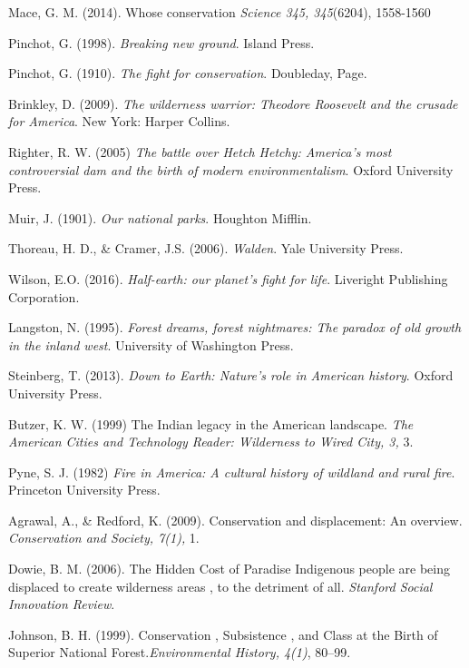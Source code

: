 \documentclass[rutwik_proposal.tex]{subfiles}
\begin{document}
\begin{thebibliography}{100}

Mace, G. M.
(2014).
Whose conservation
\emph{Science 345, 345}(6204),
1558-1560

Pinchot, G.
(1998).
\emph{Breaking new ground}.
Island Press.

Pinchot, G.
(1910).
\emph{The fight for conservation}.
Doubleday, Page.

Brinkley, D.
(2009).
\emph{The wilderness warrior: Theodore Roosevelt and the crusade for America}.
New York: Harper Collins.

Righter, R. W.
(2005)
\emph{The battle over Hetch Hetchy: America's most controversial dam and the birth of modern environmentalism}.
Oxford University Press.

Muir, J.
(1901).
\emph{Our national parks}.
Houghton Mifflin.

Thoreau, H. D., \& Cramer, J.S.
(2006).
\emph{Walden}.
Yale University Press.

Wilson, E.O.
(2016).
\emph{Half-earth: our planet's fight for life}.
Liveright Publishing Corporation.

Langston, N.
(1995).
\emph{Forest dreams, forest nightmares: The paradox of old growth in the inland west}.
University of Washington Press.

Steinberg, T.
(2013).
\emph{Down to Earth: Nature's role in American history}.
Oxford University Press.

Butzer, K. W.
(1999)
The Indian legacy in the American landscape.
\emph{The American Cities and Technology Reader: Wilderness to Wired City, 3,}
3.

Pyne, S. J.
(1982)
\emph{Fire in America: A cultural history of wildland and rural fire}.
Princeton University Press.

Agrawal, A., \& Redford, K.
(2009).
Conservation and displacement: An overview.
\emph{Conservation and Society, 7(1),} 1.

Dowie, B. M.
(2006).
The Hidden Cost of Paradise Indigenous people are being displaced to create wilderness areas , to the detriment of all.
\emph{Stanford Social Innovation Review}.

Johnson, B. H.
(1999).
Conservation , Subsistence , and Class at the Birth of Superior National Forest.\emph{Environmental History, 4(1)},
80–99.


\end{thebibliography}
\end{document}
